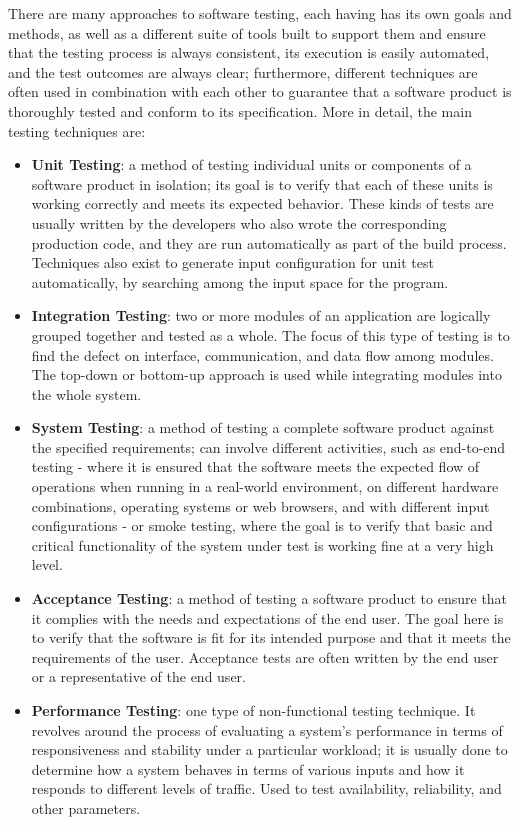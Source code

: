 There are many approaches to software testing, each having has its own goals and methods, as well as a different suite of tools built to support them and ensure that the testing process is always consistent, its execution is easily automated, and the test outcomes are always clear; furthermore, different techniques are often used in combination with each other to guarantee that a software product is thoroughly tested and conform to its specification. 
More in detail, the main testing techniques are: 
\begin{itemize}
    \item \textbf{Unit Testing}: a method of testing individual units or components of a software product in isolation; its goal is to verify that each of these units is working correctly and meets its expected behavior. These kinds of tests are usually written by the developers who also wrote the corresponding production code, and they are run automatically as part of the build process. Techniques also exist to generate input configuration for unit test automatically, by searching among the input space for the program.
    \item \textbf{Integration Testing}: two or more modules of an application are logically grouped together and tested as a whole. The focus of this type of testing is to find the defect on interface, communication, and data flow among modules. The top-down or bottom-up approach is used while integrating modules into the whole system.
    \item \textbf{System Testing}: a method of testing a complete software product against the specified requirements; can involve different activities, such as end-to-end testing - where it is ensured that the software meets the expected flow of operations when running in a real-world environment, on different hardware combinations, operating systems or web browsers, and with different input configurations - or smoke testing, where the goal is to verify that basic and critical functionality of the system under test is working fine at a very high level.
    \item \textbf{Acceptance Testing}: a method of testing a software product to ensure that it complies with the needs and expectations of the end user. The goal here is to verify that the software is fit for its intended purpose and that it meets the requirements of the user. Acceptance tests are often written by the end user or a representative of the end user.
    \item \textbf{Performance Testing}: one type of non-functional testing technique. It revolves around the process of evaluating a system's performance in terms of responsiveness and stability under a particular workload; it is usually done to determine how a system behaves in terms of various inputs and how it responds to different levels of traffic. Used to test availability, reliability, and other parameters.

\end{itemize}
